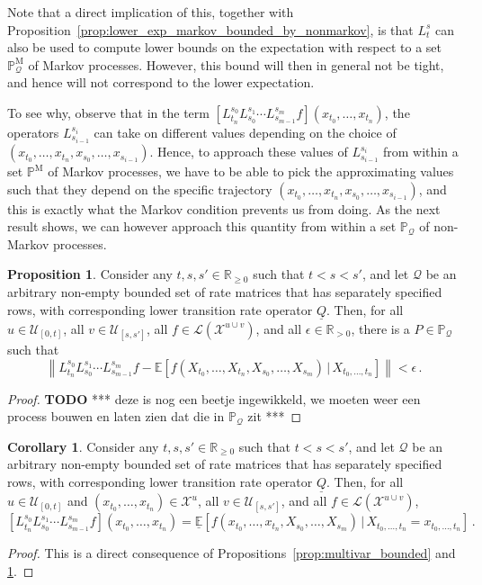 \documentclass[10pt]{paper}
\theoremstyle{definition}
\newtheorem{proposition}[theorem]{Proposition}
\newtheorem{corollary}[theorem]{Corollary}
\newcommand{\reals}{\mathbb{R}}
\newcommand{\realspos}{\reals_{>0}}
\newcommand{\realsnonneg}{\reals_{\geq 0}}
\newcommand{\states}{\mathcal{X}}
\newcommand{\processes}{\mathbb{P}}
\newcommand{\mprocesses}{\processes^{\mathrm{M}}}
\newcommand{\gambles}{\mathcal{L}}
\newcommand{\rateset}{\mathcal{Q}}
\newcommand{\lrate}{\underline{Q}}
\newcommand{\norm}[1]{\left\lVert #1 \right\rVert}
\begin{document}
Note that a direct implication of this, together with Proposition~\ref{prop:lower_exp_markov_bounded_by_nonmarkov}, is that $L_t^s$ can also be used to compute lower bounds on the expectation with respect to a set $\mprocesses_\rateset$ of Markov processes. However, this bound will then in general not be tight, and hence will not correspond to the lower expectation.

To see why, observe that in the term $[L_{t_n}^{s_0}L_{s_0}^{s_1}\cdots L_{s_{m-1}}^{s_m}f](x_{t_0},\ldots,x_{t_n})$, the operators $L_{s_{i-1}}^{s_i}$ can take on different values depending on the choice of $(x_{t_0},\ldots,x_{t_n},x_{s_0},\ldots,x_{s_{i-1}})$. Hence, to approach these values of $L_{s_{i-1}}^{s_i}$ from within a set $\mprocesses$ of Markov processes, we have to be able to pick the approximating values such that they depend on the specific trajectory $(x_{t_0},\ldots,x_{t_n},x_{s_0},\ldots,x_{s_{i-1}})$, and this is exactly what the Markov condition prevents us from doing. As the next result shows, we can however approach this quantity from within a set $\processes_\rateset$ of non-Markov processes.

\begin{proposition}\label{prop:multivar_bound_tight}
Consider any $t,s,s'\in\realsnonneg$ such that $t<s<s'$, and let $\rateset$ be an arbitrary non-empty bounded set of rate matrices that has separately specified rows, with corresponding lower transition rate operator $\lrate$. Then, for all $u\in\mathcal{U}_{[0,t]}$, all $v\in\mathcal{U}_{[s,s']}$, all $f\in\gambles(\states^{u\cup v})$, and all $\epsilon\in\realspos$, there is a $P\in\processes_\rateset$ such that
\begin{equation*}
\norm{L_{t_n}^{s_0}L_{s_0}^{s_1}\cdots L_{s_{m-1}}^{s_m}f - \mathbb{E}[f(X_{t_0},\ldots,X_{t_n},X_{s_0},\ldots,X_{s_m})\,\vert\,X_{t_0,\ldots,t_n}]} < \epsilon\,.
\end{equation*}
\end{proposition}
\begin{proof}
{\bf TODO} *** deze is nog een beetje ingewikkeld, we moeten weer een process bouwen en laten zien dat die in $\processes_\rateset$ zit ***
\end{proof}
\begin{corollary}
Consider any $t,s,s'\in\realsnonneg$ such that $t<s<s'$, and let $\rateset$ be an arbitrary non-empty bounded set of rate matrices that has separately specified rows, with corresponding lower transition rate operator $\lrate$. Then, for all $u\in\mathcal{U}_{[0,t]}$ and $(x_{t_0},\ldots,x_{t_n})\in\states^u$, all $v\in\mathcal{U}_{[s,s']}$, and all $f\in\gambles(\states^{u\cup v})$,
\begin{equation*}
\left[L_{t_n}^{s_0}L_{s_0}^{s_1}\cdots L_{s_{m-1}}^{s_m}f\right](x_{t_0},\ldots,x_{t_n}) = \underline{\mathbb{E}}[f(x_{t_0},\ldots,x_{t_n},X_{s_0},\ldots,X_{s_m})\,\vert\,X_{t_0,\ldots,t_n}=x_{t_0,\ldots,t_n}]\,.
\end{equation*}
\end{corollary}
\begin{proof}
This is a direct consequence of Propositions~\ref{prop:multivar_bounded} and \ref{prop:multivar_bound_tight}.
\end{proof}
\end{document}
